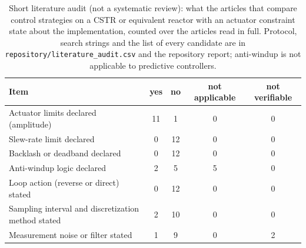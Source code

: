 \begin{table}[t]
\centering
\footnotesize
\setlength{\tabcolsep}{3pt}
\caption{Short literature audit (not a systematic review): what the articles that compare control strategies on a CSTR or equivalent reactor with an actuator constraint state about the implementation, counted over the articles read in full. Protocol, search strings and the list of every candidate are in \texttt{repository/literature\_audit.csv} and the repository report; anti-windup is not applicable to predictive controllers.}
\label{tab:literature_audit}
\begin{tabular}{lcccc}
\toprule
Item & yes & no & not applicable & not verifiable \\
\midrule
Actuator limits declared (amplitude) & 11 & 1 & 0 & 0 \\
Slew-rate limit declared & 0 & 12 & 0 & 0 \\
Backlash or deadband declared & 0 & 12 & 0 & 0 \\
Anti-windup logic declared & 2 & 5 & 5 & 0 \\
Loop action (reverse or direct) stated & 0 & 12 & 0 & 0 \\
Sampling interval and discretization method stated & 2 & 10 & 0 & 0 \\
Measurement noise or filter stated & 1 & 9 & 0 & 2 \\
\bottomrule
\end{tabular}
\end{table}
